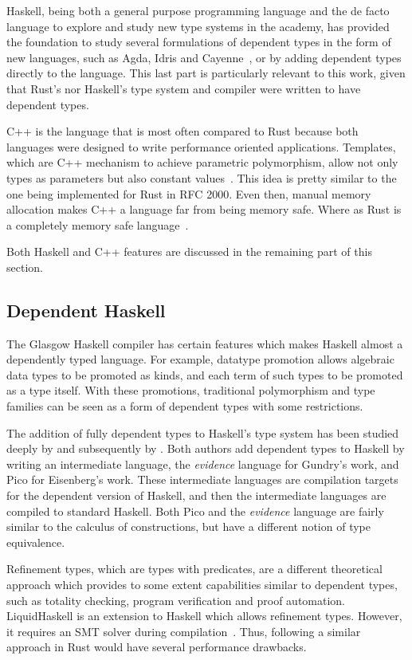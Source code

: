 Haskell, being both a general purpose programming language and the de facto
language to explore and study new type systems in the academy, has provided the
foundation to study several formulations of dependent types in the form of new
languages, such as Agda, Idris \cite{idris} and Cayenne~\cite{cayenne}, or by
adding dependent types directly to the language. This last part is particularly
relevant to this work, given that Rust's nor Haskell's type system and compiler
were written to have dependent types.

C++ is the language that is most often compared to Rust because both languages
were designed to write performance oriented applications. Templates, which are
C++ mechanism to achieve parametric polymorphism, allow not only types as
parameters but also constant values~\cite{templates}. This idea is pretty
similar to the one being implemented for Rust in RFC 2000. Even then, manual
memory allocation makes C++ a language far from being memory safe. Where as Rust
is a completely memory safe language~\cite{ralf}.    

Both Haskell and C++ features are discussed in the remaining part of this
section.

\subsection{Dependent Haskell} 

The Glasgow Haskell compiler has certain features which makes Haskell almost a
dependently typed language. For example, datatype promotion allows algebraic
data types to be promoted as kinds, and each term of such types to be promoted
as a type itself. With these promotions, traditional polymorphism and type
families can be seen as a form of dependent types with some restrictions.

The addition of fully dependent types to Haskell's type system has been studied
deeply by \citet{gundry} and subsequently by \citet{eisenberg}. Both authors
add dependent types to Haskell by writing an intermediate language, the
\textit{evidence} language for Gundry's work, and Pico for Eisenberg's work.
These intermediate languages are compilation targets for the dependent version
of Haskell, and then the intermediate languages are compiled to standard
Haskell. Both Pico and the \textit{evidence} language are fairly similar to the
calculus of constructions, but have a different notion of type equivalence.

Refinement types, which are types with predicates, are a different theoretical
approach which provides to some extent capabilities similar to dependent types,
such as totality checking, program verification and proof automation.
LiquidHaskell is an extension to Haskell which allows refinement types. However,
it requires an SMT solver during compilation~\cite{liquidhaskell}. Thus,
following a similar approach in Rust would have several performance drawbacks.

